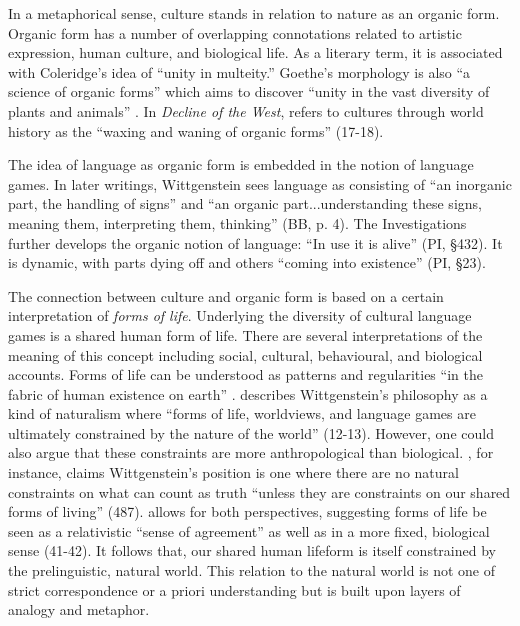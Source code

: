 In a metaphorical sense, culture stands in relation to nature as an organic form. Organic form has a number of overlapping connotations related to artistic expression, human culture, and biological life. As a literary term, it is associated with Coleridge's idea of ``unity in multeity.'' Goethe's morphology is also ``a science of organic forms'' which aims to discover ``unity in the vast diversity of plants and animals'' \citep[xvi]{Miller2009a}. In \textit{Decline of the West}, \cite{Spengler1965a} refers to cultures through world history as the ``waxing and waning of organic forms'' (17-18).

The idea of language as organic form is embedded in the notion of language games. In later writings, Wittgenstein sees language as consisting of ``an inorganic part, the handling of signs'' and ``an organic part...understanding these signs, meaning them, interpreting them, thinking'' (BB, p. 4). The Investigations further develops the organic notion of language: ``In use it is alive'' (PI, \S 432). It is dynamic, with parts dying off and others ``coming into existence'' (PI, \S 23).

The connection between culture and organic form is based on a certain interpretation of \textit{forms of life}. Underlying the diversity of cultural language games is a shared human form of life. There are several interpretations of the meaning of this concept including social, cultural, behavioural, and biological accounts. Forms of life can be understood as patterns and regularities ``in the fabric of human existence on earth'' \citep[132]{Pitkin1985a}. \cite*{Sluga2011a} describes Wittgenstein's philosophy as a kind of naturalism where ``forms of life, worldviews, and language games are ultimately constrained by the nature of the world'' (12-13). However, one could also argue that these constraints are more anthropological than biological. \cite{Keith2012a}, for instance, claims Wittgenstein's position is one where there are no natural constraints on what can count as truth ``unless they are constraints on our shared forms of living'' (487). \cite{Cavell2013a} allows for both perspectives, suggesting forms of life be seen as a relativistic ``sense of agreement'' as well as in a more fixed, biological sense (41-42). It follows that, our shared human lifeform is itself constrained by the prelinguistic, natural world. This relation to the natural world is not one of strict correspondence or a priori understanding but is built upon layers of analogy and metaphor. 


